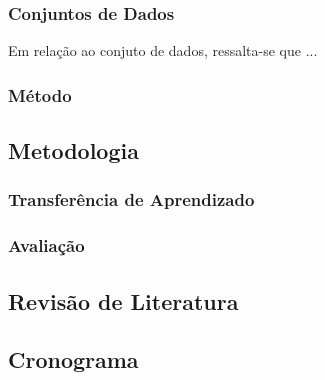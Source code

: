 \subsubsection{Conjuntos de Dados}
\label{proposal:dataset}

Em relação ao conjuto de dados, ressalta-se que ...

\subsubsection{Método}
\label{proposal:method}

\subsection{Metodologia}
\label{proposal:methodology}

\subsubsection{Transferência de Aprendizado}
\label{proposal:transf}

\subsubsection{Avaliação}
\label{proposal:avaliation}

\subsection{Revisão de Literatura}
\label{proposal:revision}

\subsection{Cronograma}
\label{proposal:cron}
